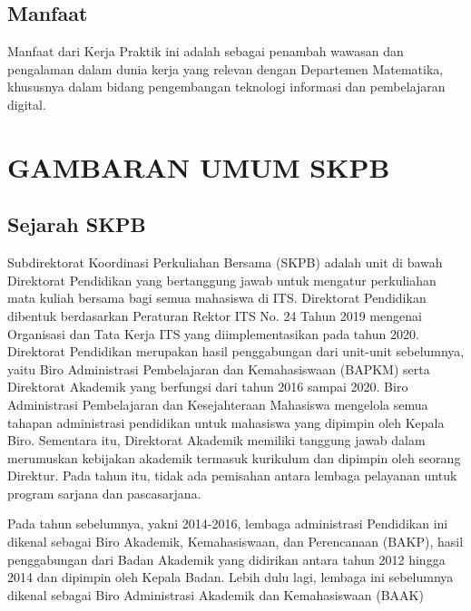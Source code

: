 \documentclass{file/KP-ITS}
\theoremstyle{definition}
\theoremstyle{definition}
\theoremstyle{plain}
\begin{document}
\section{Manfaat}
Manfaat dari Kerja Praktik ini adalah sebagai penambah wawasan dan pengalaman dalam dunia kerja yang relevan dengan Departemen Matematika, khususnya dalam bidang pengembangan teknologi informasi dan pembelajaran digital.


\pagebreak
\chapter{GAMBARAN UMUM SKPB}

\section{Sejarah SKPB}
Subdirektorat Koordinasi Perkuliahan Bersama (SKPB) adalah unit di bawah Direktorat Pendidikan yang bertanggung jawab untuk mengatur perkuliahan mata kuliah bersama bagi semua mahasiswa di ITS. Direktorat Pendidikan dibentuk berdasarkan Peraturan Rektor ITS No. 24 Tahun 2019 mengenai Organisasi dan Tata Kerja ITS yang diimplementasikan pada tahun 2020. Direktorat Pendidikan merupakan hasil penggabungan dari unit-unit sebelumnya, yaitu Biro Administrasi Pembelajaran dan Kemahasiswaan (BAPKM) serta Direktorat Akademik yang berfungsi dari tahun 2016 sampai 2020. Biro Administrasi Pembelajaran dan Kesejahteraan Mahasiswa mengelola semua tahapan administrasi pendidikan untuk mahasiswa yang dipimpin oleh Kepala Biro. Sementara itu, Direktorat Akademik memiliki tanggung jawab dalam merumuskan kebijakan akademik termasuk kurikulum dan dipimpin oleh seorang Direktur. Pada tahun itu, tidak ada pemisahan antara lembaga pelayanan untuk program sarjana dan pascasarjana. 

Pada tahun sebelumnya, yakni 2014-2016, lembaga administrasi Pendidikan ini dikenal sebagai Biro Akademik, Kemahasiswaan, dan Perencanaan (BAKP), hasil penggabungan dari Badan Akademik yang didirikan antara tahun 2012 hingga 2014 dan dipimpin oleh Kepala Badan. Lebih dulu lagi, lembaga ini sebelumnya dikenal sebagai Biro Administrasi Akademik dan Kemahasiswaan (BAAK)
\end{document}
